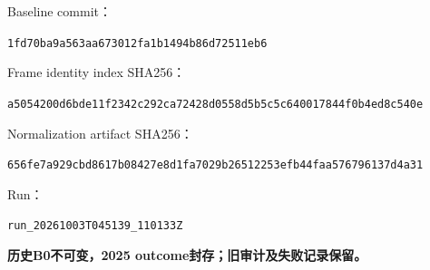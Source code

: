 \documentclass[11pt,a4paper,fontset=windows]{ctexart}
\begin{document}
Baseline commit：\par{\footnotesize\texttt{1fd70ba9a563aa673012fa1b1494b86d72511eb6}}

Frame identity index SHA256：\par{\footnotesize\texttt{a5054200d6bde11f2342c292ca72428d0558d5b5c5c640017844f0b4ed8c540e}}

Normalization artifact SHA256：\par{\footnotesize\texttt{656fe7a929cbd8617b08427e8d1fa7029b26512253efb44faa576796137d4a31}}

Run：\par{\footnotesize\texttt{run\_20261003T045139\_110133Z}}

\textbf{历史B0不可变，2025 outcome封存；旧审计及失败记录保留。}
\end{document}
